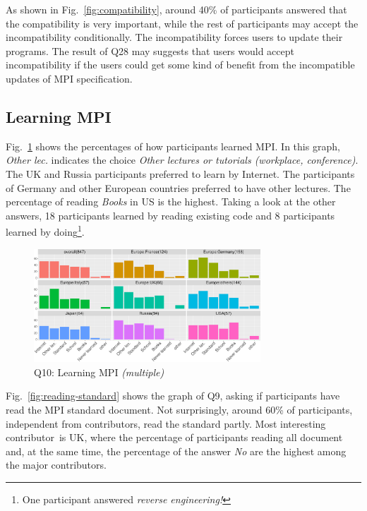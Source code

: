 \documentclass[preprint,5p,times]{elsarticle}
\def\myquote#1{{\it #1}}
\def\country{contributor}%
\def\countries{contributors}%
\def\mcountries{major contributors}%
\begin{document}
As shown in Fig.~\ref{fig:compatibility}, around 40\% of participants
answered that the compatibility is very important, while the rest of
participants may accept the incompatibility conditionally. The
incompatibility forces users to update their programs. The result of
Q28 may suggests that users would accept incompatibility if the users
could get some kind of benefit from the incompatible updates of MPI
specification.

\subsection{Learning MPI}\label{sec:learning-mpi}

Fig.~\ref{fig:learning-mpi} shows the percentages of how participants
learned MPI. In this graph, \myquote{Other lec.} indicates the choice
\myquote{Other lectures or tutorials (workplace, conference)}. The
UK and Russia participants preferred to learn by Internet. The
participants of Germany and other European countries preferred to have
other lectures. The percentage of reading \myquote{Books} in US is the
highest. Taking a look at the other answers, 18 participants learned
by reading existing code and 8 participants learned by
doing\footnote{One participant answered \myquote{reverse engineering!}}.

\begin{figure}[htb]
\begin{center}
\includegraphics[width=8.5cm]{R-scripts/Q10.pdf}
\caption{Q10: Learning MPI {\it(multiple)}}
\label{fig:learning-mpi}
\end{center}
\end{figure}

Fig.~\ref{fig:reading-standard} shows the graph of Q9, asking if
participants have read the MPI standard document. Not surprisingly,
around 60\% of participants, independent from \countries, read the
standard partly. Most interesting \country\  is UK, where the percentage
of participants reading all document and, at the same time, the
percentage of the answer \myquote{No} are the highest among the
\mcountries.
\end{document}
